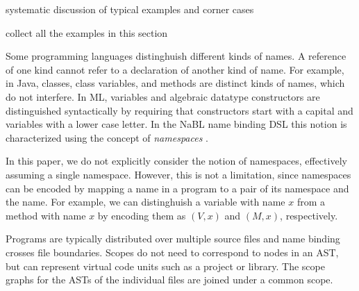 		systematic discussion of typical examples and corner cases
		
		collect all the examples in this section 
		
		

Some programming languages distinghuish different kinds of names. A reference of
one kind cannot refer to a declaration of another kind of name.
For example, in Java, classes, class variables, and methods are distinct kinds
of names, which do not interfere.
In ML, variables and algebraic datatype constructors are distinguished
syntactically by requiring that constructors start with a capital and variables
with a lower case letter. 
In the NaBL name binding DSL this notion is
characterized using the concept of \emph{namespaces} \cite{KonatKWV12}.

In this paper, we do not explicitly consider the notion of namespaces,
effectively assuming a single namespace.
However, this is not a limitation, since namespaces can be encoded by mapping a
name in a program to a pair of its namespace and the name. For example, we can
distinghuish a variable with name $x$ from a method with name $x$ by encoding
them as $(V, x)$ and $(M, x)$, respectively.


Programs are typically distributed over multiple source files and name binding
crosses file boundaries.
Scopes do not need to correspond to nodes in an
AST, but can represent virtual code units such as a project or library.
The scope graphs for the ASTs of the individual files are joined under a common
scope.
